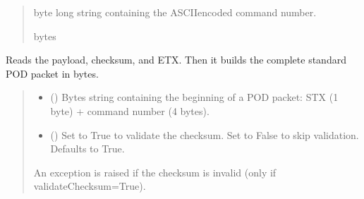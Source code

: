 \documentclass[letterpaper,10pt,english]{sphinxmanual}
\begin{document}
\begin{fulllineitems}
\begin{fulllineitems}
\begin{quote}
\begin{description}
 byte long string containing the ASCII\sphinxhyphen{}encoded command number.

\sphinxAtStartPar
bytes

\end{description}\end{quote}

\end{fulllineitems}


\begin{fulllineitems}
\label{\detokenize{PodApi.Devices:PodApi.Devices.BasicPodProtocol.Pod._Read_Standard}}
\pysigstartsignatures
{}
\pysigstopsignatures
\sphinxAtStartPar
Reads the payload, checksum, and ETX. Then it builds the complete standard POD packet in bytes.
\begin{quote}\begin{description}
\begin{itemize}
\item {} 
\sphinxAtStartPar
{} () \textendash{} Bytes string containing the beginning of a POD packet: STX (1 byte)                 + command number (4 bytes).

\item {} 
\sphinxAtStartPar
{} (\sphinxstyleliteralemphasis{\sphinxupquote{, }}) \textendash{} Set to True to validate the checksum. Set to False to                 skip validation. Defaults to True.

\end{itemize}

\sphinxAtStartPar
{} \textendash{} An exception is raised if the checksum is invalid (only if validateChecksum=True).


\end{description}
\end{quote}
\end{fulllineitems}
\end{fulllineitems}
\end{document}
